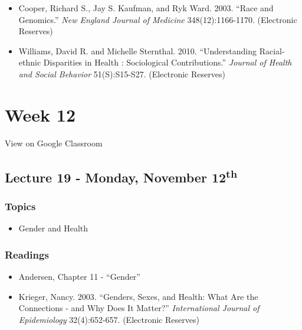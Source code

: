\documentclass[]{book}
\providecommand{\tightlist}{%
  \setlength{\itemsep}{0pt}\setlength{\parskip}{0pt}}
\theoremstyle{definition}
\theoremstyle{definition}
\theoremstyle{definition}
\theoremstyle{remark}
\begin{document}
\begin{itemize}
\tightlist
\item
  Cooper, Richard S., Jay S. Kaufman, and Ryk Ward. 2003. ``Race and
  Genomics.'' \emph{New England Journal of Medicine} 348(12):1166-1170.
  (Electronic Reserves)
\item
  Williams, David R. and Michelle Sternthal. 2010. ``Understanding
  Racial-ethnic Disparities in Health : Sociological Contributions.''
  \emph{Journal of Health and Social Behavior} 51(S):S15-S27.
  (Electronic Reserves)
\end{itemize}

\hypertarget{week-12}{%
\section*{Week 12}\label{week-12}}

View on Google Classroom

\hypertarget{lecture-19---monday-november-12th}{%
\subsection*{\texorpdfstring{Lecture 19 - Monday, November
12\textsuperscript{th}}{Lecture 19 - Monday, November 12th}}\label{lecture-19---monday-november-12th}}

\hypertarget{topics-22}{%
\subsubsection*{Topics}\label{topics-22}}

\begin{itemize}
\tightlist
\item
  Gender and Health
\end{itemize}

\hypertarget{readings-20}{%
\subsubsection*{Readings}\label{readings-20}}

\begin{itemize}
\tightlist
\item
  Andersen, Chapter 11 - ``Gender''
\item
  Krieger, Nancy. 2003. ``Genders, Sexes, and Health: What Are the
  Connections - and Why Does It Matter?'' \emph{International Journal of
  Epidemiology} 32(4):652-657. (Electronic Reserves)
\end{itemize}
\end{document}

